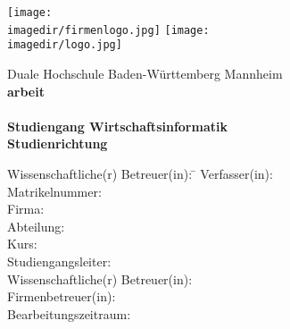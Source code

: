 \begin{titlepage}
\begin{minipage}{\textwidth}
		\vspace{-2cm}
		\noindent \texttt{[image: \\imagedir/firmenlogo.jpg]} \hfill \texttt{[image: \\imagedir/logo.jpg]}
\end{minipage}
\vspace{1em}
\begin{center}
	{\textsf{\large Duale Hochschule Baden-W\"urttemberg Mannheim}}\\[4em]
	{\textsf{\textbf{\large{\DieArtDerArbeit}arbeit}}}\\[6mm]
	{\textsf{\textbf{\Large{}\DerTitelDerArbeit}}} \\[1.5cm]
	{\textsf{\textbf{\large{}Studiengang Wirtschaftsinformatik}}\\[6mm]
	\textsf{\textbf{Studienrichtung \DieStudienrichtung}}}\vspace{10em}
	
	\begin{minipage}{\textwidth}
		\begin{tabbing}
		Wissenschaftliche(r) Betreuer(in): \hspace{0.85cm}\=\kill
		Verfasser(in): \> \DerAutorDerArbeit \\[1.5mm]
		Matrikelnummer: \> \DieMatrikelnummer \\[1.5mm]
		Firma: \> \DerNameDerFirma  \\[1.5mm]
		Abteilung: \> \DerNameDerAbteilung \\[1.5mm]
		Kurs: \> \DieKursbezeichnung \\[1.5mm]
		Studiengangsleiter: \> \DerStudiengangsleiter \\[1.5mm]
		Wissenschaftliche(r) Betreuer(in): \> \DerWissBetreuer \\[1.5mm]
		Firmenbetreuer(in): \> \DerFirmenBetreuer \\[1.5mm]
		Bearbeitungszeitraum: \> \DerBearbeitungszeitraum\\[1.5mm]
		\end{tabbing}
	\end{minipage}
\end{center}
\end{titlepage}